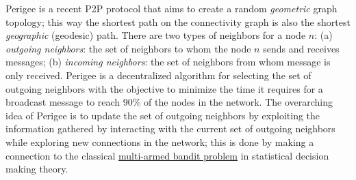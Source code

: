 \documentclass{article}
\begin{document}
{\sf Perigee} is a recent P2P protocol that aims to create a random {\em geometric} graph topology; this way the shortest path on the connectivity graph is also the shortest {\em geographic} (geodesic)  path. There are two types of neighbors for a node $n$: (a) \textit{outgoing neighbors}: the set of neighbors to whom the node $n$ sends and receives messages; (b) \textit{incoming neighbors}: the set of neighbors from whom message is only received. {\sf Perigee} is a decentralized algorithm  for selecting the set of outgoing neighbors with the objective to minimize the time it requires for a broadcast message to reach $90\%$ of the nodes in the network. The overarching idea of {\sf Perigee} is to update the set of outgoing neighbors by exploiting the information gathered by interacting with the current set of outgoing neighbors while exploring new connections in the network; this is done by making a connection to the classical \href{https://epubs.siam.org/doi/abs/10.1137/S0097539701398375}{multi-armed  bandit problem} in statistical decision making theory.
\end{document}
